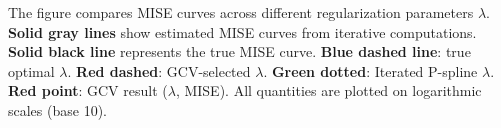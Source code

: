The figure compares MISE curves across different regularization parameters $\lambda$. \textbf{Solid gray lines} show estimated MISE curves from iterative computations. \textbf{Solid black line} represents the true MISE curve. \textbf{Blue dashed line}: true optimal $\lambda$. \textbf{Red dashed}: GCV-selected $\lambda$. \textbf{Green dotted}: Iterated P-spline $\lambda$. \textbf{Red point}: GCV result ($\lambda$, MISE). All quantities are plotted on logarithmic scales (base 10).
